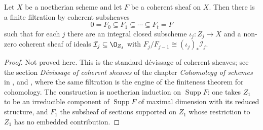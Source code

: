 \begin{lemma}\label{lem:deg-devissage}
Let $X$ be a noetherian scheme and let $F$ be a coherent sheaf on $X$.  Then
there is a finite filtration by coherent subsheaves
\[
  0=F_0\subseteq F_1\subseteq\cdots\subseteq F_t=F
\]
such that for each $j$ there are an integral closed subscheme
$\iota_j\colon Z_j\to X$ and a non-zero coherent sheaf of ideals
$\mathcal I_j\subseteq\O_{Z_j}$ with
$F_j/F_{j-1}\cong(\iota_j)_*\mathcal I_j$.
\end{lemma}
\begin{proof}
Not proved here.  This is the standard d\'evissage of coherent sheaves; see the
section \emph{D\'evissage of coherent sheaves} of the chapter \emph{Cohomology
of schemes} in \cite{stacks-project}, and \cite[III, \S5]{Hartshorne}, where
the same filtration is the engine of the finiteness theorem for cohomology.
The construction is noetherian induction on $\operatorname{Supp}F$: one takes
$Z_1$ to be an irreducible component of $\operatorname{Supp}F$ of maximal
dimension with its reduced structure, and $F_1$ the subsheaf of sections
supported on $Z_1$ whose restriction to $Z_1$ has no embedded contribution.
\end{proof}

